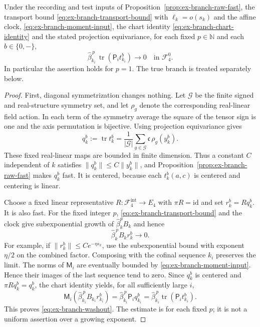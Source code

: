 \begin{proposition}
\label{prop:ex-branch-washout}
Under the recording and test inputs of
Proposition~\ref{prop:ex-branch-raw-fast}, the transport bound
\eqref{eq:ex-branch-transport-bound} with $\ell_k=o(s_k)$ and the affine
clock, \eqref{eq:ex-branch-moment-input}, the chart identity
\eqref{eq:ex-branch-chart-identity} and the stated projection
equivariance, for each
fixed $p\in\mathbb N$ and each $b\in\{0,-\}$,
\begin{equation}
 \widehat\beta_{k_i}^{\,p}\,
 \operatorname{tr}(\mathsf P_i t^b_{k_i})\longrightarrow0
 \quad\text{in }\mathcal F_4^0.
 \label{eq:ex-branch-washout}
\end{equation}
In particular the assertion holds for $p=1$. The true branch is treated
separately below.
\end{proposition}
\begin{proof}
First, diagonal symmetrization changes nothing. Let $\mathcal G$ be the
finite signed and real-structure symmetry set, and let $\rho_g$ denote
the corresponding real-linear field action. In each term of the symmetry
average the square of the tensor sign is one and the axis permutation is
bijective. Using projection equivariance gives
\[
 q^b_k:=\operatorname{tr}t^b_k
 =\frac1{|\mathcal G|}\sum_{g\in\mathcal G}\mathfrak c\,\rho_g(y^b_k).
\]
These fixed real-linear maps are bounded in finite dimension. Thus a
constant $C$ independent of $k$ satisfies
$\|q^b_k\|\le C\|y^b_k\|$, and
Proposition~\ref{prop:ex-branch-raw-fast} makes $q^b_k$ fast. It is centered, because each
$t^b_k(a,c)$ is centered and centering is linear.

Choose a fixed linear representative $R:\mathcal F_4^{\mathrm{int}}\to E_4$ with
$\pi R=\mathrm{id}$ and set $r^b_k=Rq^b_k$. It is also fast. For the
fixed integer $p$, \eqref{eq:ex-branch-transport-bound} and the clock
give subexponential growth of $\widehat\beta^p_kB_k$ and hence
\[
 \widehat\beta_k^{\,p}B_kr^b_k\longrightarrow0.
\]
For example, if $\|r^b_k\|\le C e^{-\eta s_k}$, use the subexponential
bound with exponent $\eta/2$ on the combined factor. Composing with the
cofinal sequence $k_i$ preserves the limit. The norms of $\mathsf M_i$
are eventually bounded by \eqref{eq:ex-branch-moment-input}. Hence their
images of the last sequence tend to zero. Since $q^b_k$ is centered and
$\pi Rq^b_k=q^b_k$, the chart identity yields, for all sufficiently large
$i$,
\[
 \mathsf M_i(\widehat\beta_{k_i}^{\,p}B_{k_i}r^b_{k_i})
 =\widehat\beta_{k_i}^{\,p}\mathsf P_iq^b_{k_i}
 =\widehat\beta_{k_i}^{\,p}\operatorname{tr}(\mathsf P_i t^b_{k_i}).
\]
This proves \eqref{eq:ex-branch-washout}. The estimate is for each fixed
$p$; it is not a uniform assertion over a growing exponent.
\end{proof}

